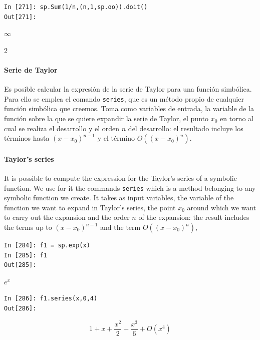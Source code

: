 \begin{center}
	\begin{minipage}{.6\textwidth}
		\begin{verbatim}
In [271]: sp.Sum(1/n,(n,1,sp.oo)).doit()
Out[271]:
		\end{verbatim}
	    $\infty$
	\end{minipage}
\end{center}

\begin{paracol}{2}
\paragraph{Serie de Taylor} Es posible calcular la expresión de la serie de Taylor para una función simbólica. Para ello se emplea el comando \texttt{series}, que es un método propio de cualquier función simbólica que creemos. Toma como variables de entrada, la variable de la función sobre la que se quiere expandir la serie de Taylor, el punto $x_0$ en torno al cual se realiza el desarrollo y el orden $n$ del desarrollo: el resultado incluye los términos hasta $(x-x_0)^{n-1}$ y el término $O\left((x-x_0)^n\right)$.
\switchcolumn
\paragraph{Taylor's series} It is possible to compute the expression for the Taylor's series of a symbolic function. We use for it the commands \texttt{series} which is a method belonging to any symbolic function we create. It takes as input variables, the variable of the function we want to expand in Taylor's series, the point $x_0$ around which we want to carry out the expansion and the order $n$ of the expansion: the result includes the terms up to $(x-x_0)^{n-1}$ and the term $O\left((x-x_0)^n\right)$,
\end{paracol}

\begin{center}
	\begin{minipage}{.3\textwidth}
		\begin{verbatim}
In [284]: f1 = sp.exp(x)
In [285]: f1
Out[285]:
		\end{verbatim}
		$e^x$
		\begin{verbatim}
In [286]: f1.series(x,0,4)
Out[286]:
		\end{verbatim}
		\begin{equation*}
		1+x+\frac{x^2}{2}+\frac{x^3}{6}+ O(x^4)
		\end{equation*}
	\end{minipage}
\end{center}

